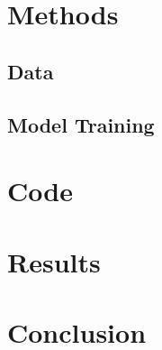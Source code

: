\documentclass[10pt,twocolumn,letterpaper]{article}
\begin{document}
\section{Methods}


\subsection{Data}


\subsection{Model Training}


\section{Code}


\section{Results}


\section{Conclusion}


\clearpage

\end{document}
